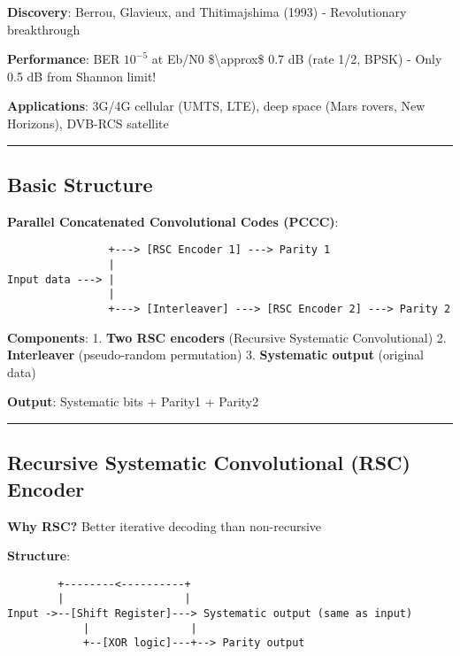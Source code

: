 \textbf{Discovery}: Berrou, Glavieux, and Thitimajshima (1993) -
Revolutionary breakthrough

\textbf{Performance}: BER \(10^{-5}\) at Eb/N0 \$\textbackslash approx\$
0.7 dB (rate 1/2, BPSK) - Only 0.5 dB from Shannon limit!

\textbf{Applications}: 3G/4G cellular (UMTS, LTE), deep space (Mars
rovers, New Horizons), DVB-RCS satellite

\begin{center}\rule{0.5\linewidth}{0.5pt}\end{center}

\subsection{Basic Structure}\label{basic-structure}

\textbf{Parallel Concatenated Convolutional Codes (PCCC)}:

\begin{verbatim}
                +---> [RSC Encoder 1] ---> Parity 1
                |
Input data ---> | 
                |
                +---> [Interleaver] ---> [RSC Encoder 2] ---> Parity 2
\end{verbatim}

\textbf{Components}: 1. \textbf{Two RSC encoders} (Recursive Systematic
Convolutional) 2. \textbf{Interleaver} (pseudo-random permutation) 3.
\textbf{Systematic output} (original data)

\textbf{Output}: Systematic bits + Parity1 + Parity2

\begin{center}\rule{0.5\linewidth}{0.5pt}\end{center}

\subsection{Recursive Systematic Convolutional (RSC)
Encoder}\label{recursive-systematic-convolutional-rsc-encoder}

\textbf{Why RSC?} Better iterative decoding than non-recursive

\textbf{Structure}:

\begin{verbatim}
        +--------<----------+
        |                   |
Input ->--[Shift Register]---> Systematic output (same as input)
            |                |
            +--[XOR logic]---+--> Parity output
\end{verbatim}

